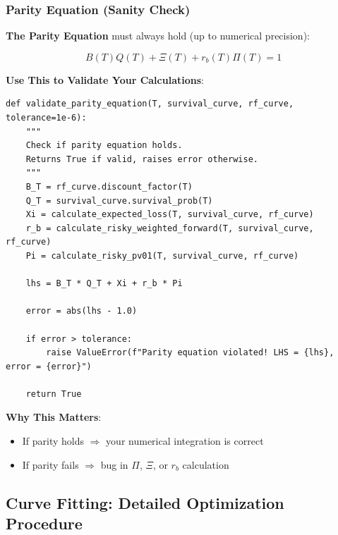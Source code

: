 \documentclass[11pt,a4paper]{article}
\begin{document}
\subsubsection{Parity Equation (Sanity Check)}

\begin{warnbox}
\textbf{The Parity Equation} must always hold (up to numerical precision):

\begin{equation}
B(T)Q(T) + \Xi(T) + r_b(T)\Pi(T) = 1
\end{equation}

\textbf{Use This to Validate Your Calculations}:
\begin{lstlisting}
def validate_parity_equation(T, survival_curve, rf_curve, tolerance=1e-6):
    """
    Check if parity equation holds.
    Returns True if valid, raises error otherwise.
    """
    B_T = rf_curve.discount_factor(T)
    Q_T = survival_curve.survival_prob(T)
    Xi = calculate_expected_loss(T, survival_curve, rf_curve)
    r_b = calculate_risky_weighted_forward(T, survival_curve, rf_curve)
    Pi = calculate_risky_pv01(T, survival_curve, rf_curve)
    
    lhs = B_T * Q_T + Xi + r_b * Pi
    
    error = abs(lhs - 1.0)
    
    if error > tolerance:
        raise ValueError(f"Parity equation violated! LHS = {lhs}, error = {error}")
    
    return True
\end{lstlisting}

\textbf{Why This Matters}:
\begin{itemize}
    \item If parity holds $\Rightarrow$ your numerical integration is correct
    \item If parity fails $\Rightarrow$ bug in $\Pi$, $\Xi$, or $r_b$ calculation
\end{itemize}
\end{warnbox}

\subsection{Curve Fitting: Detailed Optimization Procedure}
\end{document}
